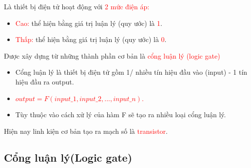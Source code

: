 \documentclass[12pt]{article}
\begin{document}
\begin{sloppypar}
Là thiết bị điện tử hoạt động với \textcolor{red}{2 mức điện áp:}

\begin{itemize}

    \item \textcolor{red}{Cao:} thể hiện bằng giá trị luận lý (quy ước) là \textcolor{red}{1}.
    \item \textcolor{red}{Thấp:} thể hiện bằng giá trị luận lý (quy ước) là \textcolor{red}{0}. 
\end{itemize}


Được xây dựng từ những thành phần cơ bản là \textcolor{red}{cổng luận lý (logic gate)}
\begin{itemize}
    \item Cổng luận lý là thiết bị điện tử gồm 1/ nhiều tín hiệu đầu vào (input) - 1 tín hiệu đầu ra output.
    \item \textcolor{red}{\begin{math}output = F (input\_1, input\_2, ..., input\_n)\end{math}.}
    \item Tùy thuộc vào cách xử lý của hàm F sẽ tạo ra nhiều loại cổng luận lý.
\end{itemize}

Hiện nay linh kiện cơ bản tạo ra mạch số là \textcolor{red}{transistor}.

\subsection{Cổng luận lý(Logic gate)}




\end{sloppypar}
\end{document}

